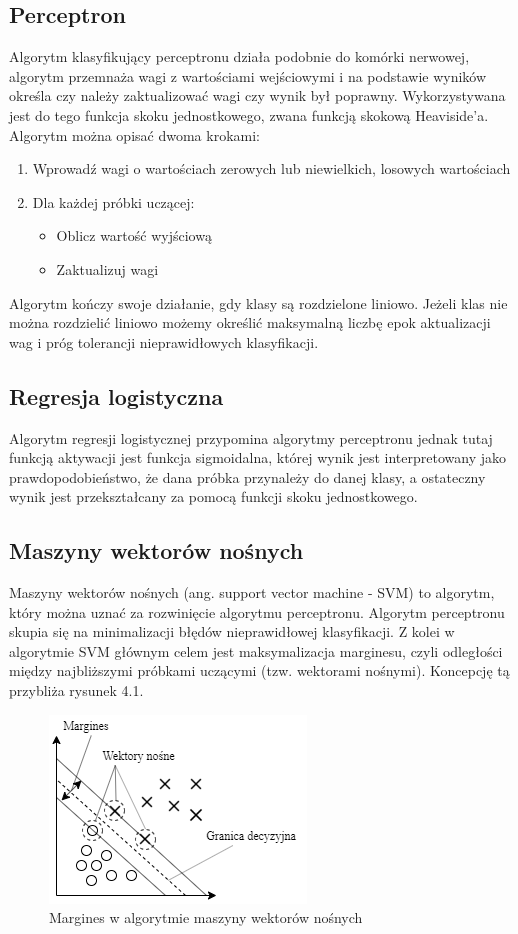 \documentclass[printmode, eng, openany]{mgr}
\newcommand\tab[1][1cm]{\hspace*{#1}}
\begin{document}
\subsection{Perceptron}
\tab Algorytm klasyfikujący perceptronu działa podobnie do komórki nerwowej, algorytm przemnaża wagi z wartościami wejściowymi i na podstawie wyników określa czy należy zaktualizować wagi czy wynik był poprawny. Wykorzystywana jest do tego funkcja skoku jednostkowego, zwana funkcją skokową Heaviside'a. Algorytm można opisać dwoma krokami:
\begin{enumerate}
\item Wprowadź wagi o wartościach zerowych lub niewielkich, losowych wartościach
\item Dla każdej próbki uczącej:
\begin{itemize}
\item Oblicz wartość wyjściową
\item Zaktualizuj wagi
\end{itemize}
\end{enumerate}

\tab Algorytm kończy swoje działanie, gdy klasy są rozdzielone liniowo. Jeżeli klas nie można rozdzielić liniowo możemy określić maksymalną liczbę epok aktualizacji wag i próg tolerancji nieprawidłowych klasyfikacji. 

\subsection{Regresja logistyczna}
\tab Algorytm regresji logistycznej przypomina algorytmy perceptronu jednak tutaj funkcją aktywacji jest funkcja sigmoidalna, której wynik jest interpretowany jako prawdopodobieństwo, że dana próbka przynależy do danej klasy, a ostateczny wynik jest przekształcany za pomocą funkcji skoku jednostkowego.

\subsection{Maszyny wektorów nośnych}
\tab Maszyny wektorów nośnych (ang. support vector machine - SVM) to algorytm, który można uznać za rozwinięcie algorytmu perceptronu. Algorytm perceptronu skupia się na minimalizacji błędów nieprawidłowej klasyfikacji. Z kolei w algorytmie SVM głównym celem jest maksymalizacja marginesu, czyli odległości między najbliższymi próbkami uczącymi (tzw. wektorami nośnymi). Koncepcję tą przybliża rysunek 4.1. 
\begin{figure}[H]
\centering
\includegraphics{svm}
\caption{Margines w algorytmie maszyny wektorów nośnych}
\end{figure}
\end{document}
